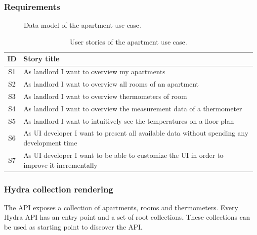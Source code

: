 \subsubsection{Requirements}

\begin{figure}[!htb]
  \caption{Data model of the apartment use case.}
\end{figure}

\begin{table}[!htb]
  \begin{center}
    \begin{tabular}{ |c|l| }
      \hline
      \textbf{ID} & \textbf{Story title} \\
      \hline
      S1 & As landlord I want to overview my apartments \\
      \hline
      S2 & As landlord I want to overview all rooms of an apartment \\
      \hline
      S3 & As landlord I want to overview thermometers of room \\
      \hline
      S4 & As landlord I want to overview the measurement data of a thermometer \\
      \hline
      S5 & As landlord I want to intuitively see the temperatures on a floor plan \\
      \hline
      S6 & As UI developer I want to present all available data without spending any development time \\
      \hline
      S7 & As UI developer I want to be able to customize the UI in order to improve it incrementally \\
      \hline
    \end{tabular}
    \caption{User stories of the apartment use case.}
    \label{tab:usecase1}
  \end{center}
\end{table}

\subsubsection{Hydra collection rendering}
The API exposes a collection of apartments, rooms and thermometers. Every Hydra API has an entry point and a set of root collections. These collections can be used as starting point to discover the API.

